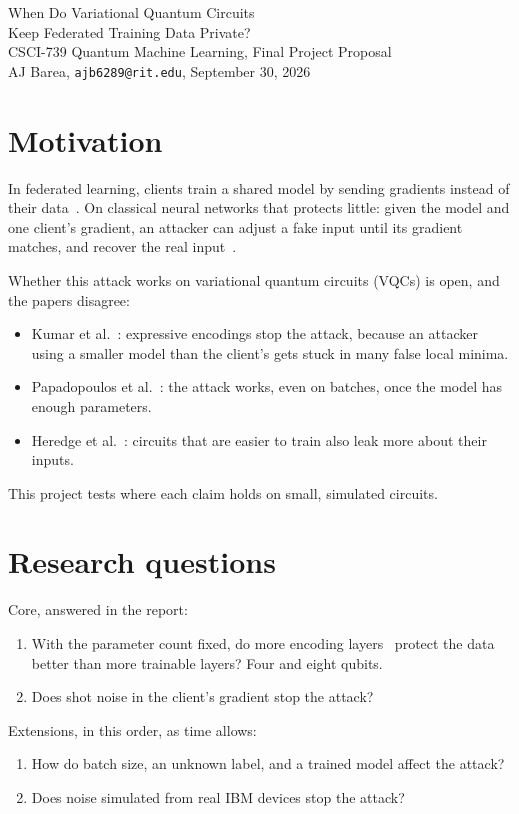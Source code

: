 \documentclass[11pt]{article}
\begin{document}
\begin{center}
  {\Large When Do Variational Quantum Circuits\\ Keep Federated Training Data Private?}\\[6pt]
  CSCI-739 Quantum Machine Learning, Final Project Proposal\\[2pt]
  AJ Barea, \texttt{ajb6289@rit.edu}, September 30, 2026
\end{center}

\section*{Motivation}

In federated learning, clients train a shared model by sending gradients instead of their
data~\cite{mcmahan2017}. On classical neural networks that protects little: given the model and
one client's gradient, an attacker can adjust a fake input until its gradient matches, and
recover the real input~\cite{zhu2019}.

Whether this attack works on variational quantum circuits (VQCs) is open, and the papers
disagree:
\begin{itemize}
  \item Kumar et al.~\cite{kumar2023}: expressive encodings stop the attack, because an attacker
        using a smaller model than the client's gets stuck in many false local minima.
  \item Papadopoulos et al.~\cite{papadopoulos2025}: the attack works, even on batches, once the
        model has enough parameters.
  \item Heredge et al.~\cite{heredge2025}: circuits that are easier to train also leak more about
        their inputs.
\end{itemize}
This project tests where each claim holds on small, simulated circuits.

\section*{Research questions}

Core, answered in the report:
\begin{enumerate}[label=\textbf{RQ\arabic*.}, left=2.5em]
  \item With the parameter count fixed, do more encoding layers~\cite{perezsalinas2020} protect
        the data better than more trainable layers? Four and eight qubits.
  \item Does shot noise in the client's gradient stop the attack?
\end{enumerate}
Extensions, in this order, as time allows:
\begin{enumerate}[label=\textbf{RQ\arabic*.}, left=2.5em, resume]
  \item How do batch size, an unknown label, and a trained model affect the attack?
  \item Does noise simulated from real IBM devices stop the attack?
\end{enumerate}
\end{document}
